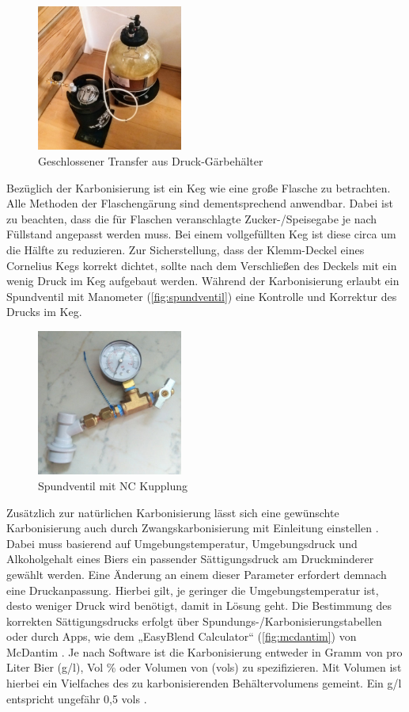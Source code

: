 \documentclass[a4paper,parskip=half]{scrartcl}
\begin{document}
\begin{figure}[h]
\centering
\includegraphics[width=4.8cm]{images/geschlossener_transfer.jpg}
\caption{Geschlossener Transfer aus Druck-Gärbehälter}
\label{fig:geschlossenertransfer}
\end{figure}

Bezüglich der Karbonisierung ist ein Keg wie eine große Flasche zu betrachten. Alle Methoden der Flaschengärung sind dementsprechend anwendbar. Dabei ist zu beachten, dass die für Flaschen veranschlagte Zucker-/Speisegabe je nach Füllstand angepasst werden muss. Bei einem vollgefüllten Keg ist diese circa um die Hälfte zu reduzieren. Zur Sicherstellung, dass der Klemm-Deckel eines Cornelius Kegs korrekt dichtet, sollte nach dem Verschließen des Deckels mit  ein wenig Druck im Keg aufgebaut werden. Während der Karbonisierung erlaubt ein Spundventil mit Manometer (\autoref{fig:spundventil}) eine Kontrolle und Korrektur des Drucks im Keg.

\begin{figure}[h]
\centering
\includegraphics[width=4.8cm]{images/spundventil.jpg}
\caption{Spundventil mit NC Kupplung}
\label{fig:spundventil}
\end{figure}

Zusätzlich zur natürlichen Karbonisierung lässt sich eine gewünschte Karbonisierung auch durch Zwangskarbonisierung mit  Einleitung einstellen \autocite{Sparks}. Dabei muss basierend auf Umgebungstemperatur, Umgebungsdruck und Alkoholgehalt eines Biers ein passender Sättigungsdruck am Druckminderer gewählt werden. Eine Änderung an einem dieser Parameter erfordert demnach eine Druckanpassung. Hierbei gilt, je geringer die Umgebungstemperatur ist, desto weniger Druck wird benötigt, damit  in Lösung geht. Die Bestimmung des korrekten Sättigungsdrucks erfolgt über Spundungs-/Karbonisierungstabellen oder durch Apps, wie dem „EasyBlend Calculator“ (\autoref{fig:mcdantim}) von McDantim \autocite{McDantim2021}. Je nach Software ist die Karbonisierung entweder in Gramm von  pro Liter Bier (g/l), Vol \% oder Volumen von  (vols) zu spezifizieren. Mit Volumen ist hierbei ein Vielfaches des zu karbonisierenden Behältervolumens gemeint. Ein g/l entspricht ungefähr 0,5 vols \autocite{BrewersAssociation2019}.
\end{document}
